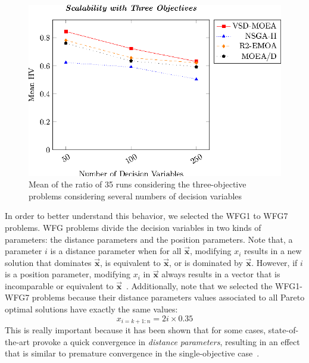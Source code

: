 \begin{figure}[t]
\centering
\includegraphics[scale=0.85]{Images/Graphic-Scalability-3obj_tikz-figure0.eps}
%
\caption{Mean of the \HV{} ratio of 35 runs considering the three-objective problems considering several numbers of decision variables} \label{fig:variable-decision-scalability-3obj}
\end{figure}

In order to better understand this behavior, we selected the WFG1 to WFG7 problems.
%
WFG problems divide the decision variables in two kinds of parameters: the distance parameters and the position parameters.
%
Note that, a parameter $i$ is a distance parameter when for all $\vec{\mathbf{x}}$, modifying $x_i$ results in a new solution 
that dominates $\vec{\mathbf{x}}$, is equivalent to $\vec{\mathbf{x}}$, or is dominated by $\vec{\mathbf{x}}$.
%
However, if $i$ is a position parameter, modifying $x_i$ in $\vec{\mathbf{x}}$ always results in a vector that is incomparable or 
equivalent to $\vec{\mathbf{x}}$~\cite{huband2005scalable}.
%
Additionally, note that we selected the WFG1-WFG7 problems because their distance parameters values associated to all Pareto optimal solutions 
have exactly the same values:
%
\begin{equation}
   x_{i=k+1:n} = 2i \times 0.35
\end{equation}
%
This is really important because it has been shown that for some cases, state-of-the-art
\MOEAS{} provoke a quick convergence in \textit{distance parameters}, resulting in an effect that is similar to premature convergence
in the single-objective case~\cite{Joel:GDE3_CEC09}.

